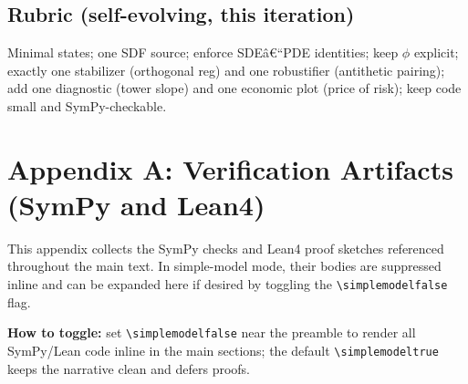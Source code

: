 \documentclass[11pt,letterpaper,oneside]{article}
\numberwithin{equation}{section}
\newif\ifsimplemodel
\newcommand{\1}{\mathbf{1}}
\begin{document}
\subsection*{Rubric (self-evolving, this iteration)}
\begin{tcolorbox}[didacticstyle]
Minimal states; one SDF source; enforce SDEâ€“PDE identities; keep $\phi$ explicit; exactly one stabilizer (orthogonal reg) and one robustifier (antithetic pairing); add one diagnostic (tower slope) and one economic plot (price of risk); keep code small and SymPy-checkable.
\end{tcolorbox}

\clearpage
\appendix
\section*{Appendix A: Verification Artifacts (SymPy and Lean4)}\label{app:verification}
\noindent
This appendix collects the SymPy checks and Lean4 proof sketches referenced throughout the main text. In simple-model mode, their bodies are suppressed inline and can be expanded here if desired by toggling the \texttt{\textbackslash simplemodelfalse} flag.

\medskip
\noindent\textbf{How to toggle:} set \verb|\simplemodelfalse| near the preamble to render all SymPy/Lean code inline in the main sections; the default \verb|\simplemodeltrue| keeps the narrative clean and defers proofs.

\bigskip

\printbibliography[heading=bibintoc,title={References}]
\end{document}
